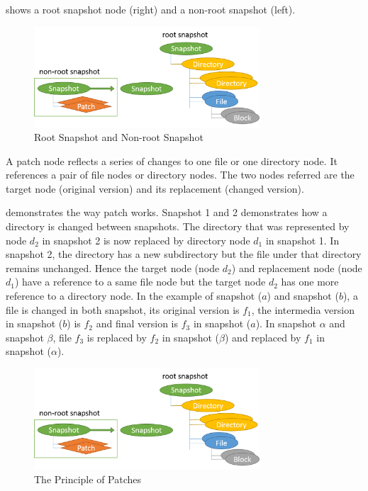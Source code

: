      shows a root snapshot node (right) and a non-root snapshot (left).
    
\begin{figure}[hbtp]
\centering
\includegraphics[width=0.75\textwidth]{Chapter-4/figs/fig12.png}
\caption{Root Snapshot and Non-root Snapshot}
\label{fig:root_and_nonroot}
\end{figure}

    A patch node reflects a series of changes to one file or one directory node. It references a pair of file nodes or directory nodes. The two nodes referred are the target node (original version) and its replacement (changed version).

     demonstrates the way patch works. Snapshot 1 and 2 demonstrates how a directory is changed between snapshots. The directory that was represented by node $d_2$ in snapshot 2 is now replaced by directory node $d_1$ in snapshot 1. In snapshot 2, the directory has a new subdirectory but the file under that directory remains unchanged. Hence the target node (node $d_2$) and replacement node (node $d_1$) have a reference to a same file node but the target node $d_2$ has one more reference to a directory node. In the example of snapshot ($a$) and snapshot ($b$), a file is changed in both snapshot, its original version is $f_1$, the intermedia version in snapshot ($b$) is $f_2$ and final version is $f_3$ in snapshot ($a$). In snapshot $\alpha$ and snapshot $\beta$, file $f_3$ is replaced by $f_2$ in snapshot ($\beta$) and replaced by $f_1$ in snapshot ($\alpha$).  

\begin{figure}[hbtp]
\centering
\includegraphics[width=0.75\textwidth]{Chapter-4/figs/fig12.png}
\caption{The Principle of Patches}
\label{fig:patches}
\end{figure}

